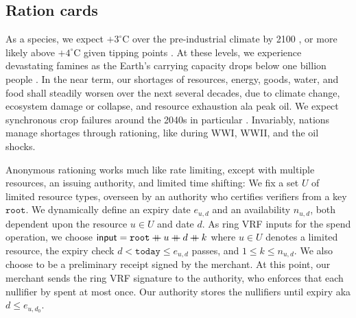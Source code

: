 \subsection{Ration cards}
\label{subsec:app_ration_carts}

As a species, we expect $+3^{\circ}$C over the pre-industrial climate
by 2100 \cite{IPCC2022}, or more likely above $+4^{\circ}$C given
tipping points \cite{tipping2022}.  %
At these levels, we experience devastating famines as the Earth's
carrying capacity drops below one billion people \cite{carrying_capacity}.
In the near term, our shortages of resources, energy, goods, water,
and food shall steadily worsen over the next several decades, due to
climate change, ecosystem damage or collapse, and resource exhaustion
ala peak oil.  We expect synchronous crop failures around the 2040s
in particular \cite{climaterisk2021}. %
Invariably, nations manage shortages through rationing, like during WWI, WWII, and the oil shocks.  

Anonymous rationing works much like rate limiting, except with
multiple resources, an issuing authority, and limited time shifting:
%
\def\expiry{e}
We fix a set $U$ of limited resource types, overseen by
an authority who certifies verifiers from a key $\mathtt{root}$.
We dynamically define an expiry date $\expiry_{u,d}$ and an availability $n_{u,d}$,
both dependent upon the resource $u \in U$ and date $d$.
As ring VRF inputs for the spend operation, we choose
$\mathsf{input} = \mathtt{root} \mathbin{+\mkern-10mu+} u \mathbin{+\mkern-10mu+} d \mathbin{+\mkern-10mu+} k$
where $u \in U$ denotes a limited resource,
the expiry check $d < \mathtt{today} \le \expiry_{u,d}$ passes,
and $1 \le k \le n_{u,d}$.
We also choose \aux to be a preliminary receipt signed by the merchant.
%
At this point, our merchant sends the ring VRF signature to the authority,
who enforces that each nullifier by spent at most once.
Our authority stores the nullifiers until expiry aka $d \le \expiry_{u,d_0}$.



